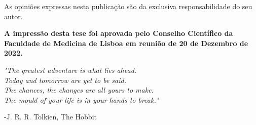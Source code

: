 \documentclass[12pt,a4paper,twoside,openright]{book}
\def\blankpage{%
      \clearpage%
      \thispagestyle{empty}%
      \null%
      \clearpage}
\begin{document}
\begin{sloppy}
\frontmatter


\clearpage \thispagestyle{empty}\mbox{}\clearpage


\clearpage \thispagestyle{empty}\mbox{}\clearpage

\newpage
\thispagestyle{empty}
\vspace*{\fill}
\begin{center}
    \vspace*{\fill}
    As opiniões expressas nesta publicação são
    da exclusiva responsabilidade do seu autor. \\
    
    \vspace*{2cm}
    
    \begingroup
        \fontsize{14pt}{12pt}\selectfont
        \textbf{A impressão desta tese foi aprovada pelo Conselho Científico da Faculdade de Medicina de Lisboa em reunião de 20 de Dezembro de 2022.}
    \endgroup
\end{center}
\blankpage

\newpage
\thispagestyle{empty}
\vspace*{3cm}
\begin{center}
\emph{"The greatest adventure is what lies ahead.\\
Today and tomorrow are yet to be said.\\
The chances, the changes are all yours to make.\\
The mould of your life is in your hands to break."} \\
\end{center} 
\begin{flushright}-J. R. R. Tolkien, The Hobbit\end{flushright}
\clearpage \thispagestyle{empty}\mbox{}\clearpage


\newpage
\thispagestyle{plain}

\end{sloppy}
\end{document}
